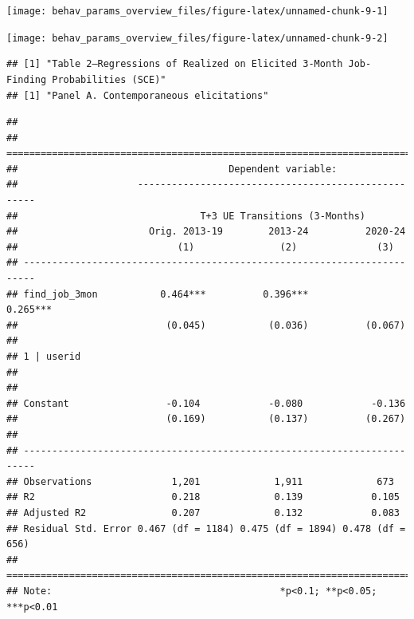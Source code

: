 \documentclass[
]{article}
\begin{document}
\begin{center}\texttt{[image: behav\_params\_overview\_files/figure-latex/unnamed-chunk-9-1]} \end{center}

\begin{center}\texttt{[image: behav\_params\_overview\_files/figure-latex/unnamed-chunk-9-2]} \end{center}

\begin{verbatim}
## [1] "Table 2—Regressions of Realized on Elicited 3-Month Job-Finding Probabilities (SCE)"
## [1] "Panel A. Contemporaneous elicitations"
\end{verbatim}

\begin{verbatim}
## 
## ========================================================================
##                                     Dependent variable:                 
##                     ----------------------------------------------------
##                                T+3 UE Transitions (3-Months)            
##                       Orig. 2013-19        2013-24          2020-24     
##                            (1)               (2)              (3)       
## ------------------------------------------------------------------------
## find_job_3mon           0.464***          0.396***          0.265***    
##                          (0.045)           (0.036)          (0.067)     
##                                                                         
## 1 | userid                                                              
##                                                                         
##                                                                         
## Constant                 -0.104            -0.080            -0.136     
##                          (0.169)           (0.137)          (0.267)     
##                                                                         
## ------------------------------------------------------------------------
## Observations              1,201             1,911             673       
## R2                        0.218             0.139            0.105      
## Adjusted R2               0.207             0.132            0.083      
## Residual Std. Error 0.467 (df = 1184) 0.475 (df = 1894) 0.478 (df = 656)
## ========================================================================
## Note:                                        *p<0.1; **p<0.05; ***p<0.01
\end{verbatim}
\end{document}
